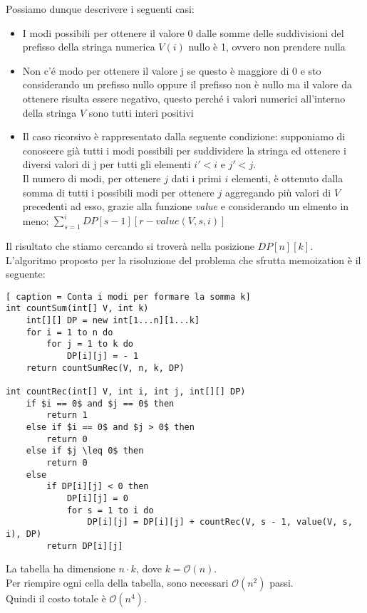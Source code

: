 \documentclass[../cheatSheetAlgoritmi.tex]{subfiles}
\begin{document}
Possiamo dunque descrivere i seguenti casi: 
\begin{itemize}
		\item I modi possibili per ottenere il valore 0 dalle somme delle suddivisioni del prefisso della stringa numerica $V(i)$ nullo è 1, ovvero non prendere nulla
		\item Non c'é modo per ottenere il valore j se questo è maggiore di 0 e sto considerando un prefisso nullo oppure il prefisso non è nullo ma il valore da ottenere risulta essere negativo, questo perché i valori numerici all'interno della stringa $V$ sono tutti interi positivi
		\item Il caso ricorsivo è rappresentato dalla seguente condizione: supponiamo di conoscere già tutti i modi possibili per suddividere la stringa ed ottenere i diversi valori di j per tutti gli elementi $i' < i$ e $j' < j$. \\ Il numero di modi, per ottenere $j$ dati i primi $i$ elementi, è ottenuto dalla somma di tutti i possibili modi per ottenere $j$ aggregando più valori di $V$ precedenti ad esso, grazie alla funzione \emph{value} e considerando un elmento in meno: $\sum_{s = 1}^{i} DP[s - 1][r - value(V, s, i)]$
\end{itemize}
Il risultato che stiamo cercando si troverà nella posizione $DP[n][k]$. \\
L'algoritmo proposto per la risoluzione del problema che sfrutta memoization è il seguente:
\newpage
\begin{lstlisting}[ caption = Conta i modi per formare la somma k]
int countSum(int[] V, int k)
	int[][] DP = new int[1...n][1...k]
	for i = 1 to n do
		for j = 1 to k do
			DP[i][j] = - 1
	return countSumRec(V, n, k, DP)

int countRec(int[] V, int i, int j, int[][] DP)
	if $i == 0$ and $j == 0$ then
		return 1
	else if $i == 0$ and $j > 0$ then
		return 0
	else if $j \leq 0$ then
		return 0
	else 
		if DP[i][j] < 0 then
			DP[i][j] = 0
			for s = 1 to i do
				DP[i][j] = DP[i][j] + countRec(V, s - 1, value(V, s, i), DP)
		return DP[i][j]
\end{lstlisting}
La tabella ha dimensione $n \cdot k$, dove $k = \mathcal{O}(n)$. \\ 
Per riempire ogni cella della tabella, sono necessari $\mathcal{O}(n^2)$ passi. \\ Quindi il costo totale è $\mathcal{O}(n^4)$. 
\newpage
\end{document}
